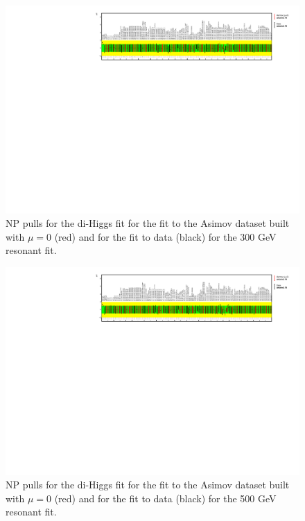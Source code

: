 \begin{figure}
\centering
\includegraphics[angle=270]{figures/results/HH/LepHad/NP_allExceptGammas_2HDM300.pdf}
\caption{NP pulls for the di-Higgs \lephad fit for the fit to the Asimov dataset built with $\mu=0$ (red) and for the fit to data (black) for the 300 GeV resonant fit.}
\label{fig:LepHadPostfitNPPulls2HDM300}
\end{figure}

\begin{figure}
\centering
\includegraphics[angle=270]{figures/results/HH/LepHad/NP_allExceptGammas_2HDM500.pdf}
\caption{NP pulls for the di-Higgs \lephad fit for the fit to the Asimov dataset built with $\mu=0$ (red) and for the fit to data (black) for the 500 GeV  resonant fit.}
\label{fig:LepHadPostfitNPPulls2HDM500}
\end{figure}

